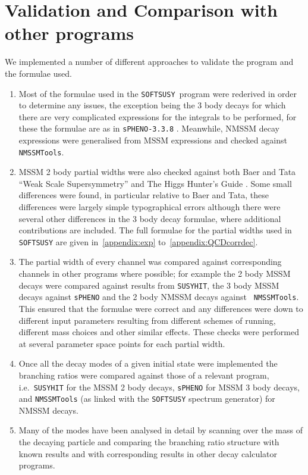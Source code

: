 \documentclass[final,3p,times,pdflatex]{elsarticle}
\def\SOFTSUSY{{\tt SOFTSUSY}}
\begin{document}
\section{Validation and Comparison with other programs \label{sec:comp}}

We implemented a number of different approaches to validate the program and the formulae used.
\begin{enumerate}
\item Most of the formulae used in the \SOFTSUSY~program were rederived in
  order to determine any issues, the exception being the 3 body decays for
  which there are very complicated expressions for the integrals to be
  performed, for these the formulae are as in {\tt sPHENO-3.3.8}
  \cite{Porod:2003um}. Meanwhile, NMSSM decay expressions were generalised from
  MSSM expressions and checked against {\tt NMSSMTools}. 
\item MSSM 2 body partial widths were also checked against both Baer and
  Tata ``Weak Scale Supersymmetry'' \cite{TataBaer} and The Higgs Hunter's
  Guide \cite{HHG}. Some small differences were found, in particular relative
  to Baer and Tata, these differences were largely simple typographical errors
  although there were several other differences in the 3 body decay
  formulae, where additional contributions are included. The full formulae for
  the partial widths used in {\tt SOFTSUSY} are given in~\ref{appendix:exp}
  to~\ref{appendix:QCDcorrdec}.  
\item The partial width of every channel was compared against corresponding
  channels in other programs where possible; for example the 2 body MSSM
  decays were compared against results from {\tt SUSYHIT}, the 3 body MSSM
  decays against {\tt sPHENO} and the 2 body NMSSM decays against {\tt
    NMSSMTools}. This ensured that the formulae were correct and any
  differences were down to different input parameters resulting from different
  schemes of running, different mass choices and other similar effects. These checks were performed at several parameter space points for each partial width.  
\item Once all the decay modes of a given initial state were implemented the
  branching ratios were compared against those of a relevant program, i.e.\
  {\tt SUSYHIT} for the MSSM 2 body decays, {\tt sPHENO} for MSSM 3 body
  decays, and {\tt NMSSMTools} (as linked with the {\tt SOFTSUSY} spectrum
  generator) for NMSSM decays. 
\item Many of the modes have been analysed in detail by scanning over the mass
  of the decaying particle and comparing the branching ratio structure with
  known results and with corresponding results in other decay calculator
  programs. 
\end{enumerate}
\end{document}
